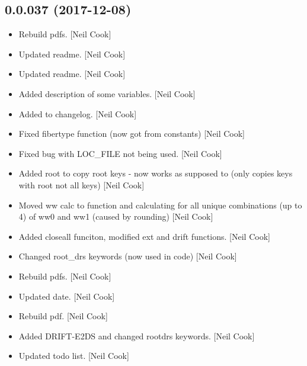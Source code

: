 \documentclass[a4paper,10pt,english]{report}
\begin{document}
\subsection{0.0.037 (2017-12-08)}
\label{\detokenize{misc/changelog:id513}}\begin{itemize}
\item {} 
Rebuild pdfs. {[}Neil Cook{]}

\item {} 
Updated readme. {[}Neil Cook{]}

\item {} 
Updated readme. {[}Neil Cook{]}

\item {} 
Added description of some variables. {[}Neil Cook{]}

\item {} 
Added to changelog. {[}Neil Cook{]}

\item {} 
Fixed fibertype function (now got from constants) {[}Neil Cook{]}

\item {} 
Fixed bug with LOC\_FILE not being used. {[}Neil Cook{]}

\item {} 
Added root to copy root keys - now works as supposed to (only copies
keys with root not all keys) {[}Neil Cook{]}

\item {} 
Moved ww calc to function and calculating for all unique combinations
(up to 4) of ww0 and ww1 (caused by rounding) {[}Neil Cook{]}

\item {} 
Added closeall funciton, modified ext and drift functions. {[}Neil Cook{]}

\item {} 
Changed root\_drs keywords (now used in code) {[}Neil Cook{]}

\item {} 
Rebuild pdfs. {[}Neil Cook{]}

\item {} 
Updated date. {[}Neil Cook{]}

\item {} 
Rebuild pdf. {[}Neil Cook{]}

\item {} 
Added DRIFT-E2DS and changed rootdrs keywords. {[}Neil Cook{]}

\item {} 
Updated todo list. {[}Neil Cook{]}


\end{itemize}
\end{document}
